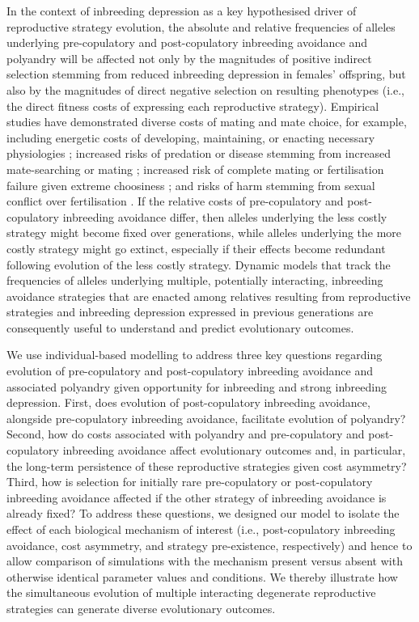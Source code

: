 \documentclass[10pt,letterpaper]{article}
\begin{document}
In the context of inbreeding depression as a key hypothesised driver of reproductive strategy evolution, the absolute and relative frequencies of alleles underlying pre-copulatory and post-copulatory inbreeding avoidance and polyandry will be affected not only by the magnitudes of positive indirect selection stemming from reduced inbreeding depression in females' offspring, but also by the magnitudes of direct negative selection on resulting phenotypes (i.e., the direct fitness costs of expressing each reproductive strategy). Empirical studies have demonstrated diverse costs of mating and mate choice, for example, including energetic costs of developing, maintaining, or enacting necessary physiologies \cite[e.g.,][]{Gasparini2011, Tuni2013, Fitzpatrick2014b}; increased risks of predation or disease stemming from increased mate-searching or mating \cite[e.g.,][]{Rowe1988, Ronkainen1994, Koga1998}; increased risk of complete mating or fertilisation failure given extreme choosiness \cite[][]{Kokko2013}; and risks of harm stemming from sexual conflict over fertilisation \cite[e.g.,][]{Rowe1994}. If the relative costs of pre-copulatory and post-copulatory inbreeding avoidance differ, then alleles underlying the less costly strategy might become fixed over generations, while alleles underlying the more costly strategy might go extinct, especially if their effects become redundant following evolution of the less costly strategy. Dynamic models that track the frequencies of alleles underlying multiple, potentially interacting, inbreeding avoidance strategies that are enacted among relatives resulting from reproductive strategies and inbreeding depression expressed in previous generations are consequently useful to understand and predict evolutionary outcomes.

We use individual-based modelling to address three key questions regarding evolution of pre-copulatory and post-copulatory inbreeding avoidance and associated polyandry given opportunity for inbreeding and strong inbreeding depression. First, does evolution of post-copulatory inbreeding avoidance, alongside pre-copulatory inbreeding avoidance, facilitate evolution of polyandry? Second, how do costs associated with polyandry and pre-copulatory and post-copulatory inbreeding avoidance affect evolutionary outcomes and, in particular, the long-term persistence of these reproductive strategies given cost asymmetry? Third, how is selection for initially rare pre-copulatory or post-copulatory inbreeding avoidance affected if the other strategy of inbreeding avoidance is already fixed? To address these questions, we designed our model to isolate the effect of each biological mechanism of interest (i.e., post-copulatory inbreeding avoidance, cost asymmetry, and strategy pre-existence, respectively) and hence to allow comparison of simulations with the mechanism present versus absent with otherwise identical parameter values and conditions. We thereby illustrate how the simultaneous evolution of multiple interacting degenerate reproductive strategies can generate diverse evolutionary outcomes. 
\end{document}
